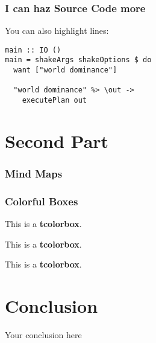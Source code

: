 \documentclass{beamer}
\begin{document}
\begin{frame}[fragile]
  \frametitle{I can haz Source Code more}
  You can also highlight lines:
  \begin{center}
\begin{verbatim}
main :: IO ()
main = shakeArgs shakeOptions $ do
  want ["world dominance"]

  "world dominance" %> \out ->
    executePlan out
\end{verbatim}
  \end{center}
\end{frame}

\section{Second Part}

\begin{frame}
  \frametitle{Mind Maps}
  \begin{center}
    \resizebox{0.8\textwidth}{!}{}
  \end{center}
\end{frame}

\begin{frame}
  \frametitle{Colorful Boxes}
  \begin{tcolorbox}[
    fonttitle=\sffamily\bfseries\large,
    colbacktitle=black,
    colframe=black,
    coltitle=beamer@centricgreen,
    title=Hello World
    ]
    This is a \textbf{tcolorbox}.
  \end{tcolorbox}
  \begin{tcolorbox}[
    fonttitle=\sffamily\bfseries\large,
    colbacktitle=black,
    colframe=black,
    coltitle=beamer@codeblue,
    title=Hello World
    ]
    This is a \textbf{tcolorbox}.
  \end{tcolorbox}
  \begin{tcolorbox}[
    fonttitle=\sffamily\bfseries\large,
    colbacktitle=black,
    colframe=black,
    title=Hello World
    ]
    This is a \textbf{tcolorbox}.
  \end{tcolorbox}
\end{frame}

\section{Conclusion}\label{sec:conclusion}

\begin{frame}
  \begin{center}
    \huge
    Your conclusion here
  \end{center}
\end{frame}
\end{document}
